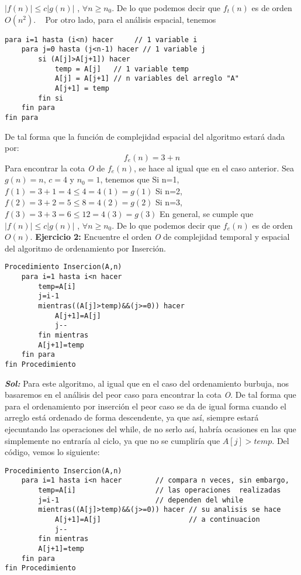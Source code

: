 \documentclass[12pt, letterpaper, twoside]{article}
\begin{document}
\center$|f(n)|\leq c|g(n)|$ , $\forall n\geq n_{0}$.
\justify
De lo que podemos decir que $f_{t}(n)$ es de orden $O(n^{2})$.\newline
\vspace{2mm} \ \newline
Por otro lado, para el análisis espacial, tenemos
\begin{lstlisting}
para i=1 hasta (i<n) hacer     // 1 variable i
	para j=0 hasta (j<n-1) hacer // 1 variable j
		si (A[j]>A[j+1]) hacer  
			temp = A[j]   // 1 variable temp
			A[j] = A[j+1] // n variables del arreglo "A"
			A[j+1] = temp
		fin si
	fin para
fin para
\end{lstlisting}
De tal forma que la función de complejidad espacial del algoritmo estará dada por:
\center
\[f_{e}(n)=3+n\]
\justify
Para encontrar la cota \textit{O} de $f_{e}(n)$, se hace al igual que en el caso anterior.\newline
Sea $g(n)=n$, $c=4$ y $n_{0}=1$, tenemos que\newline
Si n=1,
\center$f(1)=3+1=4\leq 4=4(1)=g(1)$
\justify
Si n=2,
\center$f(2)=3+2=5\leq 8=4(2)=g(2)$
\justify
Si n=3,
\center$f(3)=3+3=6\leq 12=4(3)=g(3)$
\justify
En general, se cumple que
\center$|f(n)|\leq c|g(n)|$ , $\forall n\geq n_{0}$.
\justify
De lo que podemos decir que $f_{e}(n)$ es de orden $O(n)$.
\newpage
\textbf{Ejercicio 2:} Encuentre el orden \textit{O} de complejidad temporal y espacial del algoritmo de ordenamiento por Inserción. 
\begin{lstlisting}
Procedimiento Insercion(A,n)
	para i=1 hasta i<n hacer
		temp=A[i]
		j=i-1
		mientras((A[j]>temp)&&(j>=0)) hacer
			A[j+1]=A[j]
			j--
		fin mientras
		A[j+1]=temp
	fin para
fin Procedimiento
\end{lstlisting}
\justify
\textbf{\textit{Sol:}}
Para este algoritmo, al igual que en el caso del ordenamiento burbuja, nos basaremos en el análisis del peor caso para encontrar la cota \textit{O}. De tal forma que para el ordenamiento por inserción el peor caso se da de igual forma cuando el arreglo está ordenado de forma descendente, ya que así, siempre estará ejecuntando las operaciones del while, de no serlo así, habría ocasiones en las que simplemente no entraría al ciclo, ya que no se cumpliría que $A[j]>temp$.\newline
Del código, vemos lo siguiente:
\begin{lstlisting}
Procedimiento Insercion(A,n)
	para i=1 hasta i<n hacer		// compara n veces, sin embargo,	
		temp=A[i]					// las operaciones  realizadas		
		j=i-1						// dependen del while
		mientras((A[j]>temp)&&(j>=0)) hacer // su analisis se hace   
			A[j+1]=A[j]						// a continuacion
			j--
		fin mientras
		A[j+1]=temp
	fin para
fin Procedimiento
\end{lstlisting}
\end{document}
